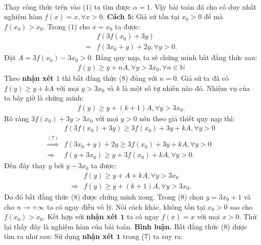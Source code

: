 \begin{multicols}{2}
\begin{align*}
	\end{align*}
	Thay công thức trên vào ($1$) ta tìm được \linebreak $\alpha = 1$.
	\vskip 0.1cm  
	Vậy bài toán đã cho có duy nhất nghiệm hàm  $f(x) = x,\forall x > 0.$ 
	\vskip 0.1cm
	\textbf{\color{hoccungpi}Cách $\pmb5$:} 
	\vskip 0.1cm    
	Giả sử tồn tại $x_0 > 0$  để mà $f({x_0}) > {x_0}.$  Trong ($1$) cho $x = {x_0}$  ta được: 
	\begin{align*}
		&f(3f({x_0}) + 3y) \\
		= &f(3{x_0} + y) + 2y,\forall y > 0. \tag{$7$}
	\end{align*}
	Đặt $A = 3f\left(x_0\right) - 3{x_0} > 0$.  Bằng quy nạp, ta sẽ chứng minh bất đẳng thức sau: 
	\begin{align*}
		f(y) \ge y + nA,\forall y > 3{x_0},\forall n \in \mathbb{N}
	\end{align*}
	Theo \textbf{\color{hoccungpi}nhận xét $1$} thì bất đẳng thức ($8$) đúng với  $n = 0$. Giả sử ta đã có $f(y) \ge y + kA$ với mọi $y > 3x_0$ và  $k$ là một số tự nhiên nào đó. Nhiệm vụ của ta bây giờ là chứng minh: 
	\begin{align*}
		f(y) \ge y + (k + 1)A,\forall y > 3{x_0}.
	\end{align*}
	Rõ ràng $3f({x_0}) + 3y > 3{x_0}$  với mọi $y > 0$ nên theo giả thiết quy nạp thì:
	\begin{align*}
		&f(3f({x_0}) \!+\! 3y) \!\ge\! 3f({x_0}) \!+\! 3y \!+\! kA,\forall\! y \!>\! 0\\
		\mathop  \Rightarrow \limits^{(7)} &f(3{x_0} \!+\! y) \!+\! 2y \!\ge\! 3f({x_0}) \!+\! 3y \!+\! kA,\forall \!y \!>\! 0\\
		\Rightarrow &f(y + 3{x_0}) \ge y + 3f({x_0}) + kA,\forall y > 0.
	\end{align*}
	Đến đây thay  $y$ bởi $y - 3x_0$  ta được:
	\begin{align*}
		&f(y) \ge y + A + kA,\forall y > 3{x_0}\\
		\Rightarrow & f(y) \ge y + (k + 1)A,\forall y > 3{x_0}.
	\end{align*}
	Do đó bất đẳng thức ($8$) được chứng minh xong. Trong ($8$) chọn $y = 3x_0 + 1$  và cho  $n \to + \infty$ ta có ngay điều vô lý.
	\vskip 0.1cm
	Nói cách khác, không tồn tại $x_0 > 0$ sao cho $f(x_0) > x_0$.  Kết hợp với \textbf{\color{hoccungpi}nhận xét $\pmb1$} ta có ngay $f(x) = x$  với mọi $x > 0$. Thử lại thấy đây là nghiệm hàm của bài toán.
	\vskip 0.1cm
	\textbf{\color{hoccungpi}Bình luận.} Bất đẳng thức ($8$) được tìm ra như sau: Sử dụng \textbf{\color{hoccungpi}nhận xét $\pmb1$} trong ($7$) ta suy ra: 

\end{multicols}
